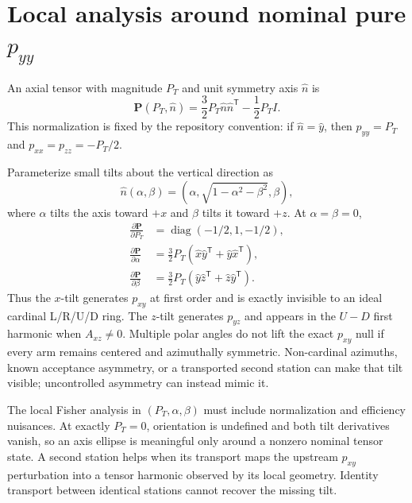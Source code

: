 \documentclass[11pt,a4paper]{article}
\newcommand{\Tens}{\bm P}
\newcommand{\diag}{\operatorname{diag}}
\begin{document}
\section{\texorpdfstring{Local analysis around nominal pure $p_{yy}$}{Local analysis around nominal pure pyy}}

An axial tensor with magnitude $P_T$ and unit symmetry axis $\hat n$ is
\begin{equation}
 \Tens(P_T,\hat n)=\frac32P_T\hat n\hat n^{\mathsf T}-\frac12P_TI.
 \label{eq:axial-tensor}
\end{equation}
This normalization is fixed by the repository convention: if $\hat n=\hat y$,
then $p_{yy}=P_T$ and $p_{xx}=p_{zz}=-P_T/2$.

Parameterize small tilts about the vertical direction as
\begin{equation}
 \hat n(\alpha,\beta)=
 \left(\alpha,\sqrt{1-\alpha^2-\beta^2},\beta\right),
\end{equation}
where $\alpha$ tilts the axis toward $+x$ and $\beta$ tilts it toward $+z$.
At $\alpha=\beta=0$,
\begin{align}
 \frac{\partial\Tens}{\partial P_T}
 &=\diag(-1/2,1,-1/2),\\
 \frac{\partial\Tens}{\partial\alpha}
 &=\frac32P_T(\hat x\hat y^{\mathsf T}+\hat y\hat x^{\mathsf T}),\\
 \frac{\partial\Tens}{\partial\beta}
 &=\frac32P_T(\hat y\hat z^{\mathsf T}+\hat z\hat y^{\mathsf T}).
 \label{eq:pyy-derivatives}
\end{align}
Thus the $x$-tilt generates $p_{xy}$ at first order and is exactly invisible to
an ideal cardinal L/R/U/D ring.  The $z$-tilt generates $p_{yz}$ and appears in
the $U-D$ first harmonic when $A_{xz}\neq0$.  Multiple polar angles do not lift
the exact $p_{xy}$ null if every arm remains centered and azimuthally symmetric.
Non-cardinal azimuths, known acceptance asymmetry, or a transported second
station can make that tilt visible; uncontrolled asymmetry can instead mimic it.

The local Fisher analysis in $(P_T,\alpha,\beta)$ must include normalization and
efficiency nuisances.  At exactly $P_T=0$, orientation is undefined and both
tilt derivatives vanish, so an axis ellipse is meaningful only around a
nonzero nominal tensor state.  A second station helps when its transport maps
the upstream $p_{xy}$ perturbation into a tensor harmonic observed by its local
geometry.  Identity transport between identical stations cannot recover the
missing tilt.
\end{document}

